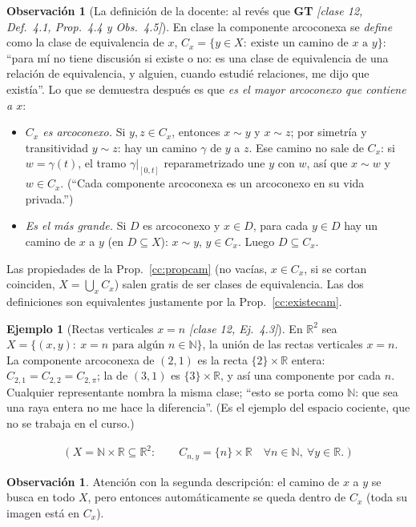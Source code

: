 \documentclass[11pt,a4paper]{article}
\newenvironment{lista}{\leavevmode\begin{itemize}[leftmargin=1.5em,itemsep=1pt,topsep=2pt,parsep=0pt]}{\end{itemize}}
\newcommand{\lgc}[1]{\par\vspace{-3pt}\begin{gather*}\big(\;#1\;\big)\end{gather*}\vspace{-6pt}}
\theoremstyle{definition}
\newtheorem{ejemplo}[definicion]{Ejemplo}
\newtheorem{observacion}[definicion]{Observación}
\theoremstyle{plain}
\newcommand{\fnt}[1]{{\normalfont\small\itshape\color{gray!150!black}[#1]}}
\newcommand{\R}{\mathbb{R}}
\newcommand{\N}{\mathbb{N}}
\begin{document}
\begin{observacion}[La definición de la docente: al revés que \textbf{GT} \fnt{clase 12, Def.\ 4.1, Prop.\ 4.4 y Obs.\ 4.5}]
En clase la componente arcoconexa se \emph{define} como la clase de equivalencia de $x$, $C_x=\{y\in X:\ \text{existe un camino de } x \text{ a } y\}$: ``para mí no tiene discusión si existe o no: es una clase de equivalencia de una relación de equivalencia, y alguien, cuando estudié relaciones, me dijo que existía''. Lo que se demuestra después es que \emph{es el mayor arcoconexo que contiene a $x$}:
\begin{lista}
\item \emph{$C_x$ es arcoconexo.} Si $y,z\in C_x$, entonces $x\sim y$ y $x\sim z$; por simetría y transitividad $y\sim z$: hay un camino $\gamma$ de $y$ a $z$. Ese camino no sale de $C_x$: si $w=\gamma(t)$, el tramo $\gamma|_{[0,t]}$ reparametrizado une $y$ con $w$, así que $x\sim w$ y $w\in C_x$. (``Cada componente arcoconexa es un arcoconexo en su vida privada.'')
\item \emph{Es el más grande.} Si $D$ es arcoconexo y $x\in D$, para cada $y\in D$ hay un camino de $x$ a $y$ (en $D\subseteq X$): $x\sim y$, $y\in C_x$. Luego $D\subseteq C_x$.
\end{lista}
Las propiedades de la Prop.~\ref{cc:propcam} (no vacías, $x\in C_x$, si se cortan coinciden, $X=\bigcup_x C_x$) salen gratis de ser clases de equivalencia. Las dos definiciones son equivalentes justamente por la Prop.~\ref{cc:existecam}.
\end{observacion}

\begin{ejemplo}[Rectas verticales $x=n$ \fnt{clase 12, Ej.\ 4.3}]\label{cc:verticalesn}
En $\R^2$ sea $X=\{(x,y):\ x=n \text{ para algún } n\in\N\}$, la unión de las rectas verticales $x=n$. La componente arcoconexa de $(2,1)$ es la recta $\{2\}\times\R$ entera: $C_{2,1}=C_{2,2}=C_{2,\pi}$; la de $(3,1)$ es $\{3\}\times\R$, y así una componente por cada $n$. Cualquier representante nombra la misma clase; ``esto se porta como $\N$: que sea una raya entera no me hace la diferencia''. (Es el ejemplo del espacio cociente, que no se trabaja en el curso.)
\lgc{X=\N\times\R\subseteq\R^2:\qquad C_{n,y}=\{n\}\times\R\quad\forall n\in\N,\ \forall y\in\R.}
\end{ejemplo}

\begin{observacion}
Atención con la segunda descripción: el camino de $x$ a $y$ se busca en todo $X$, pero entonces automáticamente se queda dentro de $C_x$ (toda su imagen está en $C_x$).
\end{observacion}
\end{document}
